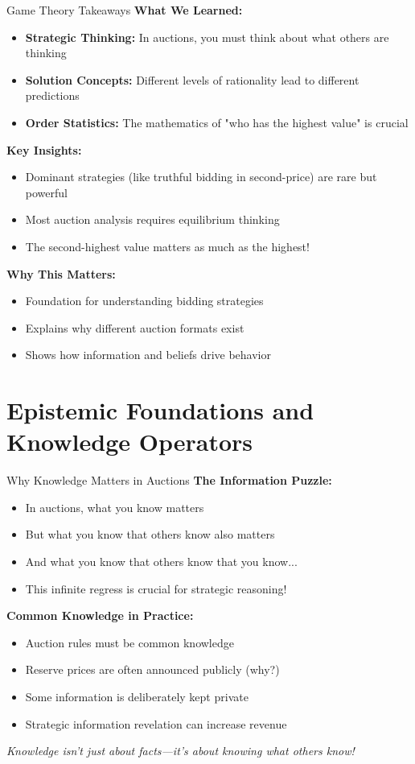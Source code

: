 \documentclass[xcolor={x11names}]{beamer}
\begin{document}
\begin{frame}{Game Theory Takeaways}
\textbf{What We Learned:}
\begin{itemize}
  \item \textbf{Strategic Thinking:} In auctions, you must think about what others are thinking
  \item \textbf{Solution Concepts:} Different levels of rationality lead to different predictions
  \item \textbf{Order Statistics:} The mathematics of "who has the highest value" is crucial
\end{itemize}

\textbf{Key Insights:}
\begin{itemize}
  \item Dominant strategies (like truthful bidding in second-price) are rare but powerful
  \item Most auction analysis requires equilibrium thinking
  \item The second-highest value matters as much as the highest!
\end{itemize}

\textbf{Why This Matters:}
\begin{itemize}
  \item Foundation for understanding bidding strategies
  \item Explains why different auction formats exist
  \item Shows how information and beliefs drive behavior
\end{itemize}
\end{frame}

\section{Epistemic Foundations and Knowledge Operators}

\begin{frame}{Why Knowledge Matters in Auctions}
\textbf{The Information Puzzle:}
\begin{itemize}
  \item In auctions, what you know matters
  \item But what you know that others know also matters
  \item And what you know that others know that you know...
  \item This infinite regress is crucial for strategic reasoning!
\end{itemize}

\textbf{Common Knowledge in Practice:}
\begin{itemize}
  \item Auction rules must be common knowledge
  \item Reserve prices are often announced publicly (why?)
  \item Some information is deliberately kept private
  \item Strategic information revelation can increase revenue
\end{itemize}

\textit{Knowledge isn't just about facts—it's about knowing what others know!}
\end{frame}
\end{document}
